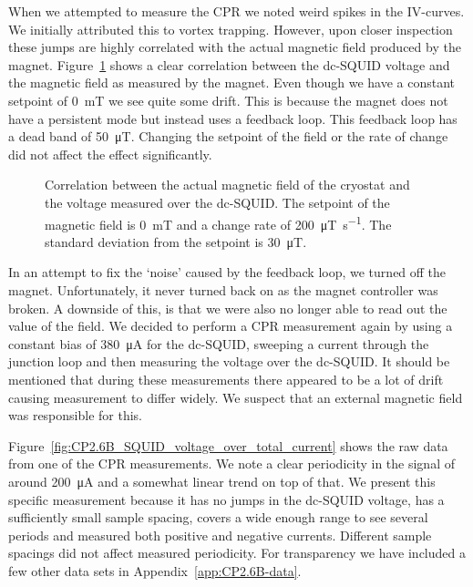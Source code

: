 When we attempted to measure the CPR we noted weird spikes in the IV-curves. We initially attributed this to vortex trapping. However, upon closer inspection these jumps are highly correlated with the actual magnetic field produced by the magnet. Figure~\ref{fig:CP2.6B_PPMS_magnetic_field_drift} shows a clear correlation between the dc-SQUID voltage and the magnetic field as measured by the magnet. Even though we have a constant setpoint of \qty{0}{\milli\tesla} we see quite some drift. This is because the magnet does not have a persistent mode but instead uses a feedback loop. This feedback loop has a dead band of \qty{50}{\micro\tesla}. Changing the setpoint of the field or the rate of change did not affect the effect significantly.

\begin{figure}[ht!]
	\centering
	
	\caption{Correlation between the actual magnetic field of the cryostat and the voltage measured over the dc-SQUID. The setpoint of the magnetic field is \qty{0}{\milli\tesla} and a change rate of \qty{200}{\micro\tesla\per\second}. The standard deviation from the setpoint is \qty{30}{\micro\tesla}.}
	\label{fig:CP2.6B_PPMS_magnetic_field_drift}
\end{figure}

In an attempt to fix the `noise' caused by the feedback loop, we turned off the magnet. Unfortunately, it never turned back on as the magnet controller was broken. A downside of this, is that we were also no longer able to read out the value of the field. We decided to perform a CPR measurement again by using a constant bias of \qty{380}{\micro\ampere} for the dc-SQUID, sweeping a current through the junction loop and then measuring the voltage over the dc-SQUID. It should be mentioned that during these measurements there appeared to be a lot of drift causing measurement to differ widely. We suspect that an external magnetic field was responsible for this. 

Figure~\ref{fig:CP2.6B_SQUID_voltage_over_total_current} shows the raw data from one of the CPR measurements. We note a clear periodicity in the signal of around \qty{200}{\micro\ampere} and a somewhat linear trend on top of that. We present this specific measurement because it has no jumps in the dc-SQUID voltage, has a sufficiently small sample spacing, covers a wide enough range to see several periods and measured both positive and negative currents. Different sample spacings did not affect measured periodicity. For transparency we have included a few other data sets in Appendix~\ref{app:CP2.6B-data}.

